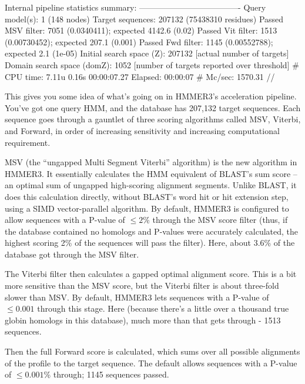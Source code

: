 \begin{sreoutput}
Internal pipeline statistics summary:
-------------------------------------
Query model(s):                            1  (148 nodes)
Target sequences:                     207132  (75438310 residues)
Passed MSV filter:                      7051  (0.0340411); expected 4142.6 (0.02)
Passed Vit filter:                      1513  (0.00730452); expected 207.1 (0.001)
Passed Fwd filter:                      1145  (0.00552788); expected 2.1 (1e-05)
Initial search space (Z):             207132  [actual number of targets]
Domain search space  (domZ):            1052  [number of targets reported over threshold]
# CPU time: 7.11u 0.16s 00:00:07.27 Elapsed: 00:00:07
# Mc/sec: 1570.31
//
\end{sreoutput}

This gives you some idea of what's going on in HMMER3's acceleration
pipeline. You've got one query HMM, and the database has 207,132
target sequences. Each sequence goes through a gauntlet of three
scoring algorithms called MSV, Viterbi, and Forward, in order of 
increasing sensitivity and increasing computational requirement. 

MSV (the ``ungapped Multi Segment Viterbi'' algorithm) is the new
algorithm in HMMER3. It essentially calculates the HMM equivalent of
BLAST's sum score -- an optimal sum of ungapped high-scoring alignment
segments. Unlike BLAST, it does this calculation directly, without
BLAST's word hit or hit extension step, using a SIMD vector-parallel
algorithm. By default, HMMER3 is configured to allow sequences with a
P-value of $\leq 2$\% through the MSV score filter (thus, if the
database contained no homologs and P-values were accurately
calculated, the highest scoring 2\% of the sequences will pass the
filter). Here, about 3.6\% of the database got through the MSV filter.

The Viterbi filter then calculates a gapped optimal alignment score.
This is a bit more sensitive than the MSV score, but the Viterbi
filter is about three-fold slower than MSV. By default, HMMER3 lets
sequences with a P-value of $\leq 0.001$ through this stage. Here
(because there's a little over a thousand true globin homologs in this
database), much more than that gets through - 1513 sequences.

Then the full Forward score is calculated, which sums over all
possible alignments of the profile to the target sequence. The default
allows sequences with a P-value of $\leq 0.001$\% through; 1145
sequences passed.

